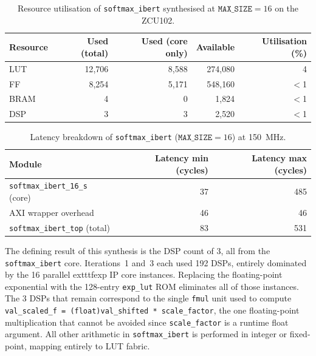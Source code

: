 \begin{table}[H]
  \centering
  \begin{tabular}{lrrrr}
    \toprule
    Resource & Used (total) & Used (core only) & Available & Utilisation (\%) \\
    \midrule
    LUT  & 12{,}706 & 8{,}588 & 274{,}080 & 4 \\
    FF   &  8{,}254 & 5{,}171 & 548{,}160 & $<$1 \\
    BRAM &        4 &       0 &   1{,}824 & $<$1 \\
    DSP  &        3 &       3 &   2{,}520 & $<$1 \\
    \bottomrule
  \end{tabular}
  \caption{Resource utilisation of \texttt{softmax\_ibert} synthesised at
           $\texttt{MAX\_SIZE} = 16$ on the ZCU102.}
  \label{tab:softmax_ibert_resources}
\end{table}

\begin{table}[H]
  \centering
  \begin{tabular}{lrr}
    \toprule
    Module & Latency min (cycles) & Latency max (cycles) \\
    \midrule
    \texttt{softmax\_ibert\_16\_s} (core) & 37 & 485 \\
    AXI wrapper overhead                  & 46 &  46 \\
    \texttt{softmax\_ibert\_top} (total)  & 83 & 531 \\
    \bottomrule
  \end{tabular}
  \caption{Latency breakdown of \texttt{softmax\_ibert}
           ($\texttt{MAX\_SIZE} = 16$) at \SI{150}{\mega\hertz}.}
  \label{tab:softmax_ibert_latency}
\end{table}

The defining result of this synthesis is the DSP count of 3, all from the
\texttt{softmax\_ibert} core. Iterations~1 and~3 each used 192 DSPs, entirely
dominated by the 16 parallel 	exttt{fexp} IP core instances. Replacing the floating-point exponential with the 128-entry
\texttt{exp\_lut} ROM eliminates all of those instances. The 3 DSPs that remain
correspond to the single \texttt{fmul} unit used to compute \texttt{val\_scaled\_f
= (float)val\_shifted * scale\_factor}, the one floating-point multiplication
that cannot be avoided since \texttt{scale\_factor} is a runtime float argument.
All other arithmetic in \texttt{softmax\_ibert} is performed in integer or
fixed-point, mapping entirely to LUT fabric.


